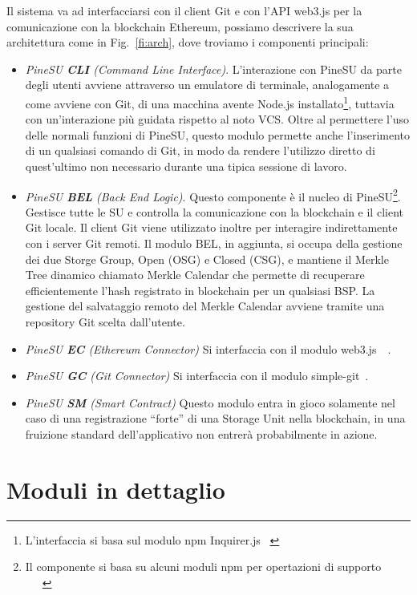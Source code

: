 Il sistema va ad interfacciarsi con il client Git e con l’API \textsf{web3.js} per la comunicazione
con la blockchain Ethereum, possiamo descrivere la sua architettura come in Fig.~\ref{fi:arch}, dove troviamo i componenti principali:
\begin{itemize}
    \item \emph{PineSU \textbf{CLI} (Command Line Interface)}. L’interazione con PineSU da parte degli utenti avviene attraverso un emulatore di terminale, analogamente a come avviene con Git, di una macchina avente Node.js installato\footnote{L’interfaccia si basa sul modulo npm Inquirer.js ~\cite{inquirer-github-21}}, tuttavia con un’interazione più guidata rispetto al noto VCS. Oltre al permettere l’uso delle normali funzioni di PineSU, questo modulo permette anche l’inserimento di un qualsiasi comando di Git, in modo da rendere l’utilizzo diretto di quest’ultimo non necessario durante una tipica sessione di lavoro.
    \item \emph{PineSU \textbf{BEL} (Back End Logic)}. Questo componente è il nucleo di PineSU\footnote{Il componente si basa su alcuni moduli npm per opertazioni di supporto ~\cite{adm-zip-github-21}~\cite{chalk-github-21}~\cite{merkle-tools-github-21}}. Gestisce tutte le SU e controlla la comunicazione con la blockchain e il client Git locale.
    Il client Git viene utilizzato inoltre per interagire indirettamente con i server Git remoti.
    Il modulo BEL, in aggiunta, si occupa della gestione dei due Storge Group, Open (OSG) e Closed (CSG), e
    mantiene il Merkle Tree dinamico chiamato Merkle Calendar che permette di recuperare efficientemente
    l’hash registrato in blockchain per un qualsiasi BSP. La gestione del salvataggio remoto del Merkle Calendar avviene tramite una repository Git scelta dall’utente.
    \item \emph{PineSU \textbf{EC} (Ethereum Connector)} Si interfaccia con il modulo \textsf{web3.js}~\cite{web3js-github-21}~\cite{web3js-doc-21}. 
    \item \emph{PineSU \textbf{GC} (Git Connector)} Si interfaccia con il modulo \textsf{simple-git}~\cite{simple-git-github-21}. 
    \item \emph{PineSU \textbf{SM} (Smart Contract)} Questo modulo entra in gioco solamente nel caso di una registrazione “forte” di una Storage Unit nella blockchain, in una fruizione standard dell’applicativo non entrerà probabilmente in azione.
\end{itemize}

\section{Moduli in dettaglio}
